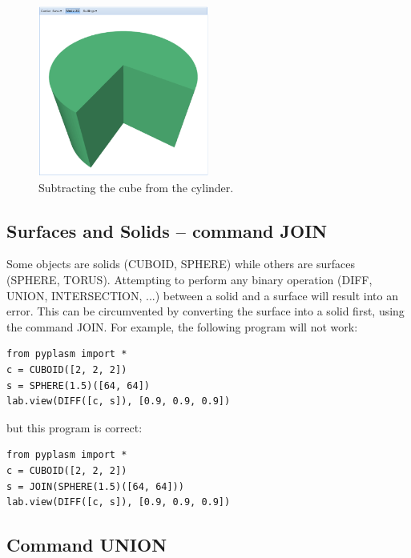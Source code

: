 \documentclass[article,A4,12pt]{llncs}
\begin{document}
\begin{figure}[!ht]
\begin{center}
\includegraphics[width=0.5\textwidth]{img/diff-2.png}
\end{center}
\vspace{-2mm}
\caption{Subtracting the cube from the cylinder.}
\label{fig:diff-2}
\end{figure}
\noindent

\subsection{Surfaces and Solids -- command JOIN}

Some objects are solids (CUBOID, SPHERE) while others are surfaces (SPHERE, TORUS). 
Attempting to perform any binary operation (DIFF, UNION, INTERSECTION, ...) between
a solid and a surface will result into an error. This can be circumvented by 
converting the surface into a solid first, using the command JOIN. For example,
the following program will not work:

\begin{verbatim}
from pyplasm import *
c = CUBOID([2, 2, 2])
s = SPHERE(1.5)([64, 64])
lab.view(DIFF([c, s]), [0.9, 0.9, 0.9])
\end{verbatim}
but this program is correct:

\begin{verbatim}
from pyplasm import *
c = CUBOID([2, 2, 2])
s = JOIN(SPHERE(1.5)([64, 64]))
lab.view(DIFF([c, s]), [0.9, 0.9, 0.9])
\end{verbatim}




\subsection{Command UNION}
\end{document}
